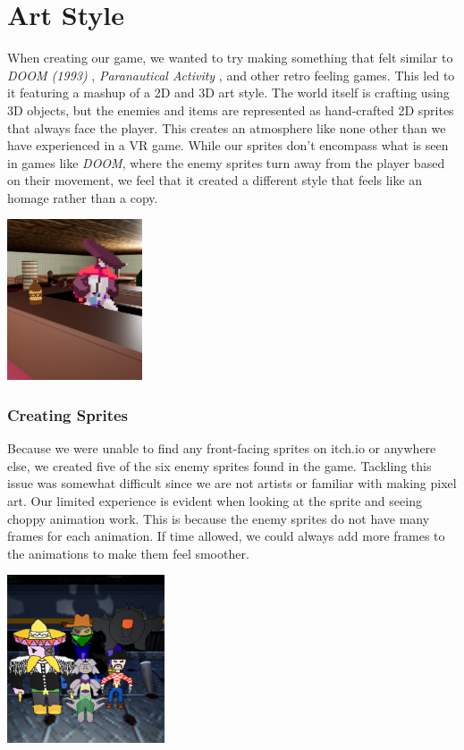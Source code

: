 \documentclass{sigchi}
\begin{document}
\section{Art Style}
When creating our game, we wanted to try making something that felt similar to \textit{DOOM (1993)} \cite{doom}, \textit{Paranautical Activity} \cite{paranautical}, and other retro feeling games. This led to it featuring a mashup of a 2D and 3D art style. The world itself is crafting using 3D objects, but the enemies and items are represented as hand-crafted 2D sprites that always face the player. This creates an atmosphere like none other than we have experienced in a VR game. While our sprites don’t encompass what is seen in games like \textit{DOOM}, where the enemy sprites turn away from the player based on their movement, we feel that it created a different style that feels like an homage rather than a copy.
\begin{center}
    \includegraphics[width=0.3\textwidth]{2D.png}
    \label{fig:2D}
\end{center}

\subsubsection*{Creating Sprites}
Because we were unable to find any front-facing sprites on itch.io \cite{itch} or anywhere else, we created five of the six enemy sprites found in the game. Tackling this issue was somewhat difficult since we are not artists or familiar with making pixel art. Our limited experience is evident when looking at the sprite and seeing choppy animation work. This is because the enemy sprites do not have many frames for each animation. If time allowed, we could always add more frames to the animations to make them feel smoother.
\begin{center}
    \includegraphics[width=0.35\textwidth]{sprite.png}
    \label{fig:Sprites}
\end{center}
\end{document}
